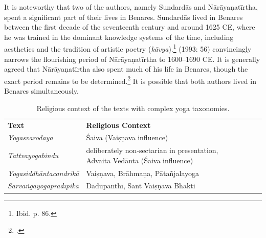 It is noteworthy that two of the authors, namely Sundardās and Nārāyaṇatīrtha, spent a significant part of their lives in Benares. Sundardās lived in Benares between the first decade of the seventeenth century and around 1625 CE, where he was trained in the dominant knowledge systems of the time, including aesthetics and the tradition of artistic poetry (\textit{kāvya}).\footnote{Ibid. p. 86.} \citeauthor{endo1993} (1993: 56) convincingly narrows the flourishing period of Nārāyaṇatīrtha to 1600–1690 CE. It is generally agreed that Nārāyaṇatīrtha also spent much of his life in Benares, though the exact period remains to be determined.\footnote{\citeauthor[2004: 24]{penna2004}.} It is possible that both authors lived in Benares simultaneously.

    \tiny
  \begin{table}[H]
  \begin{tabular}{llll}
\textbf{Text}         & \textbf{Religious Context}          \\
\textit{Yogasvarodaya}            & Śaiva (Vaiṣṇava influence)   \\
\textit{Tattvayogabindu}          & deliberately non-sectarian in presentation, Advaita Vedānta (Śaiva influence) \\
\textit{Yogasiddhāntacandrikā}    & Vaiṣṇava, Brāhmaṇa, Pātañjalayoga \\
\textit{Sarvāṅgayogapradīpikā}    & Dādūpanthī, Sant Vaiṣṇava Bhakti   \\
\end{tabular}
\caption{Religious context of the texts with complex yoga taxonomies.}
\label{tab:textetaxo}
\end{table}
\normalsize


